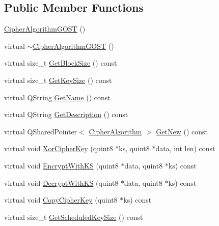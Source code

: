 \subsection*{Public Member Functions}
\begin{DoxyCompactItemize}
\item 
\hyperlink{class_gost_crypt_1_1_volume_1_1_cipher_algorithm_g_o_s_t_a259dcdbaf73aabe2575e56bf7c2abfb4}{Cipher\+Algorithm\+G\+O\+ST} ()
\item 
virtual \hyperlink{class_gost_crypt_1_1_volume_1_1_cipher_algorithm_g_o_s_t_acd7919eab7bcd00b8df0afddb6178bfe}{$\sim$\+Cipher\+Algorithm\+G\+O\+ST} ()
\item 
virtual size\+\_\+t \hyperlink{class_gost_crypt_1_1_volume_1_1_cipher_algorithm_g_o_s_t_a2a0bb62cd68fd772b6bf8558b6d138a9}{Get\+Block\+Size} () const
\item 
virtual size\+\_\+t \hyperlink{class_gost_crypt_1_1_volume_1_1_cipher_algorithm_g_o_s_t_aad89411cf81e7e506b2fbd86f433aeb4}{Get\+Key\+Size} () const
\item 
virtual Q\+String \hyperlink{class_gost_crypt_1_1_volume_1_1_cipher_algorithm_g_o_s_t_a23b0c16c11ee4d10ce2a80bfd64c6fd7}{Get\+Name} () const
\item 
virtual Q\+String \hyperlink{class_gost_crypt_1_1_volume_1_1_cipher_algorithm_g_o_s_t_a160d57aab8a7f9217c064bf308eb9aa6}{Get\+Description} () const
\item 
virtual Q\+Shared\+Pointer$<$ \hyperlink{class_gost_crypt_1_1_volume_1_1_cipher_algorithm}{Cipher\+Algorithm} $>$ \hyperlink{class_gost_crypt_1_1_volume_1_1_cipher_algorithm_g_o_s_t_abfef648c71b6819f9b75647f0a291f1b}{Get\+New} () const
\item 
virtual void \hyperlink{class_gost_crypt_1_1_volume_1_1_cipher_algorithm_g_o_s_t_a0cc29efdab0704c4d7211988f8303a15}{Xor\+Cipher\+Key} (quint8 $\ast$ks, quint8 $\ast$data, int len) const
\item 
virtual void \hyperlink{class_gost_crypt_1_1_volume_1_1_cipher_algorithm_g_o_s_t_a6cc2c22a2d097e24468a3004381df911}{Encrypt\+With\+KS} (quint8 $\ast$data, quint8 $\ast$ks) const
\item 
virtual void \hyperlink{class_gost_crypt_1_1_volume_1_1_cipher_algorithm_g_o_s_t_a416b83c6f9605fc342e3f0f3dd7c307c}{Decrypt\+With\+KS} (quint8 $\ast$data, quint8 $\ast$ks) const
\item 
virtual void \hyperlink{class_gost_crypt_1_1_volume_1_1_cipher_algorithm_g_o_s_t_aa2182b151f6de4a86be8bcc650af70a9}{Copy\+Cipher\+Key} (quint8 $\ast$ks) const
\item 
virtual size\+\_\+t \hyperlink{class_gost_crypt_1_1_volume_1_1_cipher_algorithm_g_o_s_t_aecf6aeaabec9d6bb23babf7fbfc43a93}{Get\+Scheduled\+Key\+Size} () const
\end{DoxyCompactItemize}
